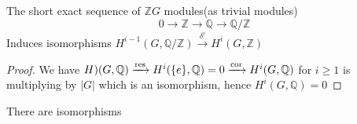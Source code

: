 \documentclass[a4paper,10pt]{article}
\begin{document}
\begin{lemma}
The short exact sequence of $\mathbb ZG$ modules(as trivial modules)
\[
0\to \mathbb Z\to\mathbb Q\to\mathbb Q/\mathbb Z
\]
Induces isomorphisms $H^{i-1}(G,\mathbb Q/\mathbb Z)\xrightarrow{\delta^i}H^i(G,\mathbb Z)$
\end{lemma}

\begin{proof}
We have $H^^i(G,\mathbb Q)\xrightarrow{\res}H^i(\{e\},\mathbb Q)=0\xrightarrow{\cor}H^i(G,\mathbb Q)$ for $i\geq1$ is multiplying by $|G|$ which is an isomorphism, hence $H^i(G,\mathbb Q)=0$
\end{proof}

\begin{corollary}
There are isomorphisms
\begin{center}
\end{center}
\end{corollary}
\end{document}
